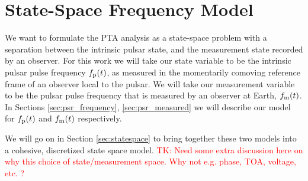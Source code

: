 \documentclass[fleqn,usenatbib,useAMS]{mnras}
\begin{document}
\section{State-Space Frequency Model}\label{sec:model}
We want to formulate the PTA analysis as a state-space problem with a separation between the intrinsic pulsar state, and the measurement state recorded by an observer. For this work we will take our state variable to be the intrinsic pulsar pulse frequency $f_{\rm p}(t)$, as measured in the momentarily comoving reference frame of an observer local to the pulsar. We will take our measurement variable to be the pulsar pulse frequency that is measured by an observer at Earth, $f_{\rm m}(t)$.  In Sections \ref{sec:psr_frequency}, \ref{sec:psr_measured} we will describe our model for $f_{\rm p}(t)$ and  $f_{\rm m}(t)$ respectively. 




We will go on in Section \ref{sec:statespace} to bring together these two models into a cohesive, discretized state space model. 
\textcolor{red}{TK: Need some extra discussion here on why this choice of state/measurement space. Why not e.g. phase, TOA, voltage, etc. ?}
\end{document}
